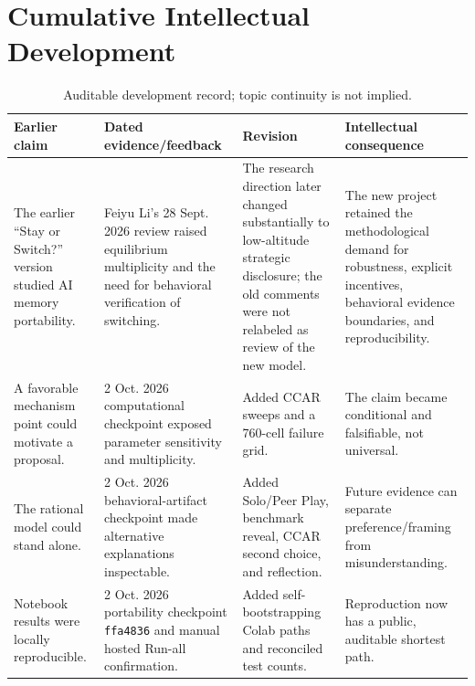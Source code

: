 \section{Cumulative Intellectual Development}
\begin{table}[H]
\caption{Auditable development record; topic continuity is not implied.}
\centering\scriptsize
\begin{tabularx}{\columnwidth}{@{}p{1.6cm}p{2.0cm}YY@{}}\toprule
Earlier claim & Dated evidence/feedback & Revision & Intellectual consequence \\\midrule
The earlier ``Stay or Switch?'' version studied AI memory portability. & Feiyu Li's 28 Sept. 2026 review raised equilibrium multiplicity and the need for behavioral verification of switching. & The research direction later changed substantially to low-altitude strategic disclosure; the old comments were not relabeled as review of the new model. & The new project retained the methodological demand for robustness, explicit incentives, behavioral evidence boundaries, and reproducibility. \\
A favorable mechanism point could motivate a proposal. & 2 Oct. 2026 computational checkpoint exposed parameter sensitivity and multiplicity. & Added CCAR sweeps and a 760-cell failure grid. & The claim became conditional and falsifiable, not universal. \\
The rational model could stand alone. & 2 Oct. 2026 behavioral-artifact checkpoint made alternative explanations inspectable. & Added Solo/Peer Play, benchmark reveal, CCAR second choice, and reflection. & Future evidence can separate preference/framing from misunderstanding. \\
Notebook results were locally reproducible. & 2 Oct. 2026 portability checkpoint \texttt{ffa4836} and manual hosted Run-all confirmation. & Added self-bootstrapping Colab paths and reconciled test counts. & Reproduction now has a public, auditable shortest path. \\
\bottomrule\end{tabularx}
\end{table}

\clearpage\onecolumn
